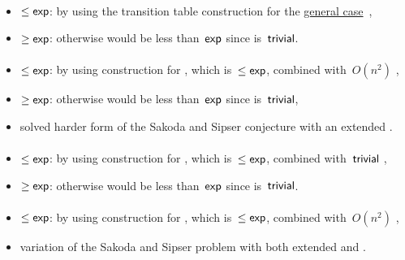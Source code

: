 \paragraph{\OLA{}\tto\ONFA}\label{cost:1DLAto1NFAu}
\begin{itemize}
	\item $\le\mathsf{exp}$: by using the transition table construction for the \hyperref[cost:1LAto1NFA]{general case}~\cite{PigPis14},
	\item $\ge\mathsf{exp}$: otherwise \hyperref[cost:1DLAto1NFAu]{\ODLA{}\tto\ONFA} would be less than~$\mathsf{exp}$ since \ODLA{}\tto\OLA is~$\mathsf{trivial}$.
\end{itemize}
\paragraph{\OLA{}\tto\TDFA}
\begin{itemize}
	\item $\le\mathsf{exp}$: by using construction for \hyperref[cost:1LAto1NFAu]{\OLA{}\tto\ONFA}, which is~$\le\mathsf{exp}$, combined with~$O(n^2)$ \hyperref[cost:1NFAto2DFAu]{\ONFA{}\tto\TDFA},
	\item $\ge\mathsf{exp}$: otherwise \hyperref[cost:1DLAto2DFAu]{\ODLA{}\tto\TDFA} would be less than~$\mathsf{exp}$ since \ODLA{}\tto\OLA is~$\mathsf{trivial}$,
	\item solved harder form of the Sakoda and Sipser conjecture with an extended \TNFA.
\end{itemize}
\paragraph{\OLA{}\tto\TNFA}
\begin{itemize}
	\item $\le\mathsf{exp}$: by using construction for \hyperref[cost:1LAto1NFAu]{\OLA{}\tto\ONFA}, which is~$\le\mathsf{exp}$, combined with~$\mathsf{trivial}$ \ONFA{}\tto\TNFA,
	\item $\ge\mathsf{exp}$: otherwise \hyperref[cost:1DLAto2NFAu]{\ODLA{}\tto\TNFA} would be less than~$\mathsf{exp}$ since \ODLA{}\tto\OLA is~$\mathsf{trivial}$.
\end{itemize}
\paragraph{\OLA{}\tto\ODLA}
\begin{itemize}
	\item $\le\mathsf{exp}$: by using construction for \hyperref[cost:1LAto1NFAu]{\OLA{}\tto\ONFA}, which is~$\le\mathsf{exp}$, combined with~$O(n^2)$ \hyperref[cost:1NFAto1DLAu]{\ONFA{}\tto\ODLA},
	\item variation of the Sakoda and Sipser problem with both extended \TNFA and \TDFA.
\end{itemize}


